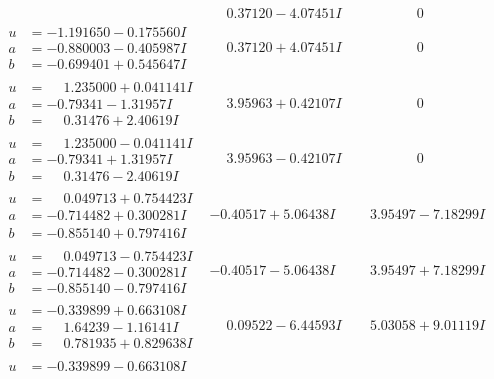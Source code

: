 \documentclass[1p]{elsarticle_modified}
\theoremstyle{definition}
\begin{document}
$$\begin{array}{c|c|c}
 & \phantom{-}0.37120 - 4.07451 I & \phantom{-0.000000 } 0 \\ \hline\begin{aligned}
u &= -1.191650 - 0.175560 I \\
a &= -0.880003 - 0.405987 I \\
b &= -0.699401 + 0.545647 I\end{aligned}
 & \phantom{-}0.37120 + 4.07451 I & \phantom{-0.000000 } 0 \\ \hline\begin{aligned}
u &= \phantom{-}1.235000 + 0.041141 I \\
a &= -0.79341 - 1.31957 I \\
b &= \phantom{-}0.31476 + 2.40619 I\end{aligned}
 & \phantom{-}3.95963 + 0.42107 I & \phantom{-0.000000 } 0 \\ \hline\begin{aligned}
u &= \phantom{-}1.235000 - 0.041141 I \\
a &= -0.79341 + 1.31957 I \\
b &= \phantom{-}0.31476 - 2.40619 I\end{aligned}
 & \phantom{-}3.95963 - 0.42107 I & \phantom{-0.000000 } 0 \\ \hline\begin{aligned}
u &= \phantom{-}0.049713 + 0.754423 I \\
a &= -0.714482 + 0.300281 I \\
b &= -0.855140 + 0.797416 I\end{aligned}
 & -0.40517 + 5.06438 I & \phantom{-}3.95497 - 7.18299 I \\ \hline\begin{aligned}
u &= \phantom{-}0.049713 - 0.754423 I \\
a &= -0.714482 - 0.300281 I \\
b &= -0.855140 - 0.797416 I\end{aligned}
 & -0.40517 - 5.06438 I & \phantom{-}3.95497 + 7.18299 I \\ \hline\begin{aligned}
u &= -0.339899 + 0.663108 I \\
a &= \phantom{-}1.64239 - 1.16141 I \\
b &= \phantom{-}0.781935 + 0.829638 I\end{aligned}
 & \phantom{-}0.09522 - 6.44593 I & \phantom{-}5.03058 + 9.01119 I \\ \hline\begin{aligned}
u &= -0.339899 - 0.663108 I \\

\end{aligned}
\end{array}$$
\end{document}
